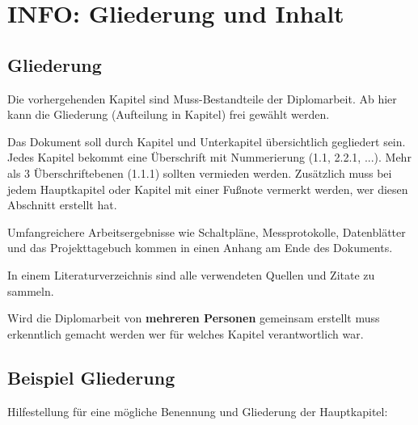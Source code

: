 


\chapter{INFO: Gliederung und Inhalt}

\section{Gliederung}

Die vorhergehenden Kapitel sind Muss-Bestandteile der Diplomarbeit.
Ab hier kann die Gliederung (Aufteilung in Kapitel) frei gewählt werden.

Das Dokument soll durch Kapitel und Unterkapitel übersichtlich gegliedert sein. 
Jedes Kapitel bekommt eine Überschrift mit Nummerierung (1.1, 2.2.1, ...). Mehr als 3 Überschriftebenen (1.1.1) sollten vermieden werden. Zusätzlich muss bei jedem Hauptkapitel oder Kapitel mit einer Fußnote vermerkt werden, wer diesen Abschnitt erstellt hat.

Umfangreichere Arbeitsergebnisse wie Schaltpläne, Messprotokolle, Datenblätter und das Projekttagebuch kommen in einen Anhang am Ende des Dokuments.

In einem Literaturverzeichnis sind alle verwendeten Quellen und Zitate zu sammeln.

Wird die Diplomarbeit von \textbf{mehreren Personen} gemeinsam erstellt muss erkenntlich gemacht werden wer für welches Kapitel verantwortlich war.

\section{Beispiel Gliederung}

Hilfestellung für eine mögliche Benennung und Gliederung der Hauptkapitel:


